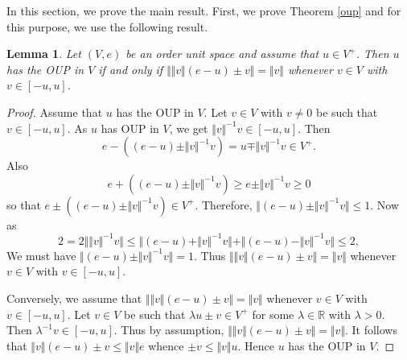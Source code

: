 \documentclass[12pt]{amsart}
\newtheorem{lemma}[theorem]{Lemma}
\begin{document}
In this section, we prove the main result. First, we prove Theorem \ref{oup} and for this purpose, we use the following result.
\begin{lemma}\label{oupl}
	Let $(V, e)$ be an order unit space and assume that $u \in V^+$. Then $u$ has the OUP in $V$ if and only if $\Vert \Vert v \Vert (e - u) \pm v \Vert = \Vert v \Vert$ whenever $v \in V$ with $v \in [- u, u]$. 
\end{lemma}
\begin{proof}
	Assume that $u$ has the OUP in $V$. Let $v \in V$ with $v \ne 0$ be such that $v \in [- u, u]$. As $u$ has OUP in $V$, we get  $\Vert v \Vert^{-1} v \in [- u, u]$. Then 
	$$e - \left( (e - u) \pm \Vert v \Vert^{-1} v \right) = u \mp \Vert v \Vert^{-1} v \in V^+.$$ 
	Also 
	$$e + \left( (e - u) \pm \Vert v \Vert^{-1} v \right) \ge e \pm \Vert v \Vert^{-1} v \ge 0$$ 
	so that $e \pm \left( (e - u) \pm \Vert v \Vert^{-1} v \right) \in V^+$. Therefore, $\Vert (e - u) \pm \Vert v \Vert^{-1} v \Vert \le 1$. Now as 
	$$2 = 2 \Vert \Vert v \Vert^{-1} v \Vert \le \Vert (e - u) + \Vert v \Vert^{-1} v \Vert + \Vert (e - u) - \Vert v \Vert^{-1} v \Vert \le 2,$$ 
	We must have $\Vert (e - u) \pm \Vert v \Vert^{-1} v \Vert = 1$. Thus $\Vert \Vert v \Vert (e - u) \pm v \Vert = \Vert v \Vert$ whenever $v \in V$ with $v \in [- u, u]$.
	
	Conversely, we assume that $\Vert \Vert v \Vert (e - u) \pm v \Vert = \Vert v \Vert$ whenever $v \in V$ with $v \in [- u, u]$. Let $v \in V$ be such that $\lambda u \pm v \in V^+$ for some $\lambda \in \mathbb{R}$ with $\lambda > 0$. Then $\lambda^{-1} v \in [- u, u]$. Thus by assumption, $\Vert \Vert v \Vert (e - u) \pm v \Vert = \Vert v \Vert$. It follows that $\Vert v \Vert (e - u) \pm v \le \Vert v \Vert e$ whence $\pm v \le \Vert v \Vert u$. Hence $u$ has the OUP in $V$. 
\end{proof}
\end{document}
